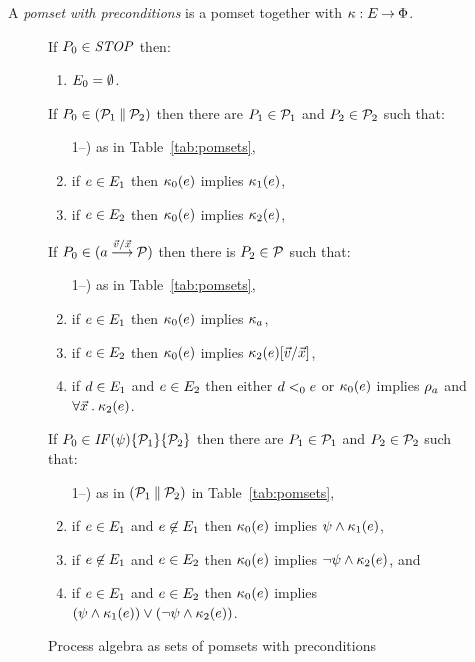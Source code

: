 \begin{definition}
  A \emph{pomset with preconditions} is
  a pomset together with $\kappa:E\mathbin\rightarrow\Phi$.
\end{definition}

\begin{figure*}
  If $P_0\in\mathit{STOP}$ then:
  \begin{enumerate}
  \item $E_0 = \emptyset$.
  \end{enumerate}
  If $P_0 \in (\mathcal{P}_1\mathbin{\parallel}\mathcal{P}_2)$ then
  there are $P_1\in\mathcal{P}_1$ and $P_2\in\mathcal{P}_2$ such that:
  \begin{enumerate}
     \setcounter{enumi}{\value{pomsetParCount}}
  \item[1--\thepomsetParCount)] as in Table~\ref{tab:pomsets},
  \item if $e\in E_1$ then $\kappa_0(e)$ implies $\kappa_1(e)$,
  \item if $e\in E_2$ then $\kappa_0(e)$ implies $\kappa_2(e)$,
    \setcounter{pomsetPreParCount}{\value{enumi}}
  \end{enumerate}
  If $\aPS_0 \in (\aAct\wPREFIX[\vec\aVal/\vec\aVar]\aPSS)$ then there is $P_2\in\mathcal{P}$ such that:
  \begin{enumerate}
     \setcounter{enumi}{\value{pomsetPrefixCount}}
  \item[1--\thepomsetPrefixCount)] as in Table~\ref{tab:pomsets},
  \item if $e\in E_1$ then $\kappa_0(e)$ implies $\kappa_a$,
  \item if $e\in E_2$ then $\kappa_0(e)$ implies $\kappa_2(e)[\vec{v}/\vec{x}]$,
  \item if $d\in E_1$ and $e\in E_2$ then either $d<_0e$ or 
    $\kappa_0(e)$ implies $\rho_a$ and $\forall\vec{x}\mathbin.\kappa_2(e)$.
  \end{enumerate}
  If $P_0 \in \mathit{IF}({\psi})\{\mathcal{P}_1\}\{\mathcal{P}_2\}$ then
  there are $P_1\in\mathcal{P}_1$ and $P_2\in\mathcal{P}_2$ such that:
  \begin{enumerate}
  \setcounter{enumi}{\value{pomsetwParCount}}
  \item[1--\thepomsetwParCount)] as in $(\mathcal{P}_1\mathbin{\parallel}\mathcal{P}_2)$  in Table~\ref{tab:pomsets},
  \item if $e\in E_1$ and $e\not\in E_1$ then $\kappa_0(e)$ implies $\psi\land\kappa_1(e)$,
  \item if $e\not\in E_1$ and $e\in E_2$ then $\kappa_0(e)$ implies $\neg\psi\land\kappa_2(e)$, and
  \item if $e\in E_1$ and $e\in E_2$ then $\kappa_0(e)$ implies $(\psi\land\kappa_1(e))\lor(\neg\psi\land\kappa_2(e))$.
    \setcounter{pomsetPreIfCount}{\value{enumi}}
  \end{enumerate}
\caption{Process algebra as sets of pomsets with preconditions}
\label{tab:pomsets-pre}
\end{figure*}

